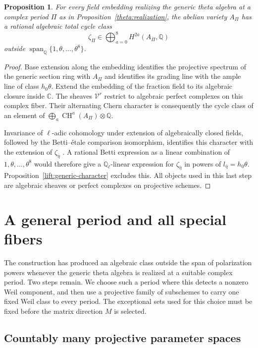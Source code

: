 \documentclass[11pt]{article}
\newtheorem{proposition}[theorem]{Proposition}
\theoremstyle{definition}
\theoremstyle{remark}
\newcommand{\Q}{\mathbb Q}
\newcommand{\C}{\mathbb C}
\DeclareMathOperator{\CH}{CH}
\numberwithin{equation}{section}
\begin{document}
\begin{proposition}
\label{lift:complex-class}
For every field embedding realizing the generic theta algebra at a
complex period $\Pi$ as in Proposition~\ref{theta:realization}, the abelian
variety $A_\Pi$ has a rational algebraic total cycle class
\[
 \zeta_\Pi\in\bigoplus_{a=0}^8H^{2a}(A_\Pi,\Q)
\]
outside $\operatorname{span}_\Q\{1,\theta,\ldots,\theta^8\}$.
\end{proposition}

\begin{proof}
Base extension along the embedding identifies the projective spectrum
of the generic section ring with $A_\Pi$ and identifies its grading line
with the ample line of class $h_0\theta$.  Extend the embedding of the
fraction field to its algebraic closure inside $\C$.  The sheaves
$\mathcal V^r$ restrict to algebraic perfect complexes on this complex
fiber.  Their alternating Chern character is consequently the cycle
class of an element of $\bigoplus_a\CH^a(A_\Pi)\otimes\Q$.

Invariance of $\ell$-adic cohomology under extension of algebraically
closed fields, followed by the Betti--\'etale comparison isomorphism,
identifies this character with the extension of $\zeta_{\bar\eta}$
\cite{smooth-proper}.  A rational Betti expression as a linear
combination of $1,\theta,\ldots,\theta^8$ would therefore give a
$\Q_\ell$-linear expression for $\zeta_{\bar\eta}$ in powers of
$l_{\bar\eta}=h_0\theta$.  Proposition~\ref{lift:generic-character}
excludes this.  All objects used in this last step are algebraic
sheaves or perfect complexes on projective schemes.
\end{proof}

\section{A general period and all special fibers}
\label{spread:section}

The construction has produced an algebraic class outside the span of
polarization powers whenever the generic theta algebra is realized at a
suitable complex period.  Two steps remain.  We choose such a period
where this detects a nonzero Weil component, and then use a projective
family of subschemes to carry one fixed Weil class to every period.
The exceptional sets used for this choice must be fixed before the
matrix direction $M$ is selected.

\subsection{Countably many projective parameter spaces}
\end{document}
